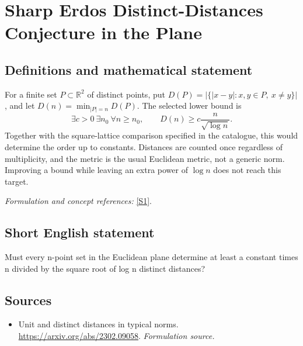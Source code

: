 \documentclass[11pt]{article}
\begin{document}
\section*{\texorpdfstring{Sharp Erdos Distinct-Distances Conjecture in the Plane}{Sharp Erdos Distinct-Distances Conjecture in the Plane}}\label{218}
\subsection{Definitions and mathematical statement}
For a finite set $P\subset{\mathbb{R}}^2$ of distinct points, put
$D(P)=|\{|x-y|:x,y\in P,\ x\ne y\}|$, and let
$D(n)=\min_{|P|=n}D(P)$. The selected lower bound is
\[
 \exists c>0\ \exists n_0\ \forall n\ge n_0,
 \qquad D(n)\ge c\frac{n}{\sqrt{\log n}}.
\]
Together with the square-lattice comparison specified in the catalogue, this would determine the order up to constants. Distances are counted once regardless of multiplicity, and the metric is the usual Euclidean metric, not a generic norm. Improving a bound while leaving an extra power of $\log n$ does not reach this target.
\par\smallskip\textit{Formulation and concept references:} \href{https://arxiv.org/abs/2302.09058}{[S1]}.

\subsection{Short English statement}
Must every n-point set in the Euclidean plane determine at least a constant times n divided by the square root of log n distinct distances?
\subsection{Sources}
\begin{itemize}
\item[S1]Unit and distinct distances in typical norms.
\url{https://arxiv.org/abs/2302.09058}.
\textit{Formulation source.}
\end{itemize}
\end{document}
